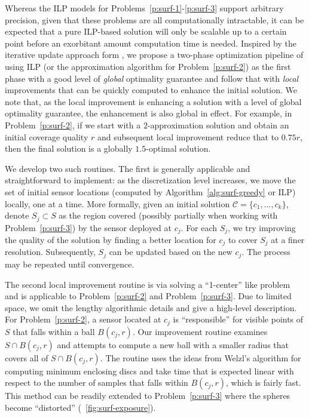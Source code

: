 Whereas the ILP models for Problems~\ref{p:surf-1}-\ref{p:surf-3} support arbitrary precision, given that these problems are all computationally intractable, it can be expected that a pure ILP-based solution will only be scalable up to a certain point before an exorbitant amount computation time is needed. Inspired by the iterative update approach form \cite{cortes2004coverage}, we propose a two-phase optimization pipeline of 
using ILP (or the approximation algorithm for Problem~\ref{p:surf-2}) as the first phase with a good level of \emph{global} optimality guarantee and follow that with \emph{local} improvements that can be quickly computed to enhance the initial solution. We note that, as the local improvement is enhancing a solution with a level of global optimality guarantee, the enhancement is also global in effect. For example, in Problem~\ref{p:surf-2}, if we start with a $2$-approximation solution and obtain an initial coverage quality $r$ and subsequent local improvement reduce that to $0.75r$, then the final solution is a globally $1.5$-optimal solution.

We develop two such routines. The first is generally applicable and straightforward to implement: as the discretization level increases, we move the set of initial sensor locations (computed by Algorithm~\ref{alg:surf-greedy} or ILP) locally, one at a time. More formally, given an initial solution $\mathcal C = \{c_1, \dots, c_k\}$, denote $S_j \subset S$ as the region covered (possibly partially when working with Problem~\ref{p:surf-3}) by the sensor deployed at $c_j$. For each $S_j$, we try improving the quality of the solution by finding a better location for $c_j$ to cover $S_j$ at a finer resolution. Subsequently, $S_j$ can be updated based on the new $c_j$. The process may be repeated until convergence. 

The second local improvement routine is via solving a ``1-center'' like problem 
and is applicable to Problem~\ref{p:surf-2} and Problem~\ref{p:surf-3}. Due to limited space, 
we omit the lengthy algorithmic details and give a high-level description. 
For Problem~\ref{p:surf-2}, a sensor located at $c_j$ is ``responsible'' for visible points of $S$ 
that falls within a ball $B(c_j, r)$. 
Our improvement routine examines $S \cap B(c_j, r)$ and attempts to compute a new ball with 
a smaller radius that covers all of $S \cap B(c_j, r)$. 
The routine uses the ideas from Welzl's algorithm for computing minimum enclosing discs \cite{welzl1991smallest, Mark1997computation} and take time that is expected linear with respect to the number of samples that falls within $B(c_j, r)$, which is fairly fast. This method can be readily extended to Problem~\ref{p:surf-3} 
where the spheres become ``distorted'' (~\ref{fig:surf-exposure}).
